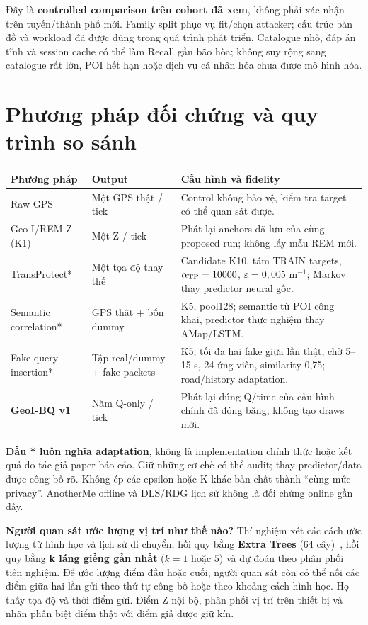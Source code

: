 Đây là \textbf{controlled comparison trên cohort đã xem}, không phải xác nhận trên tuyến/thành phố mới.
Family split phục vụ fit/chọn attacker; cấu trúc bản đồ và workload đã được dùng trong quá trình phát triển.
Catalogue nhỏ, đáp án tĩnh và session cache có thể làm Recall gần bão hòa; không suy rộng sang catalogue rất lớn,
POI hết hạn hoặc dịch vụ cá nhân hóa chưa được mô hình hóa.

\section{Phương pháp đối chứng và quy trình so sánh}
\noindent\begin{tabularx}{\linewidth}{@{}P{3.4cm}P{3.6cm}Y@{}}\toprule
\textbf{Phương pháp} & \textbf{Output} & \textbf{Cấu hình và fidelity}\\\midrule
Raw GPS & Một GPS thật / tick & Control không bảo vệ, kiểm tra target có thể quan sát được.\\
Geo-I/REM Z (K1) & Một Z / tick & Phát lại anchors đã lưu của cùng proposed run; không lấy mẫu REM mới.\\
TransProtect* & Một tọa độ thay thế & Candidate K10, tám TRAIN targets, $\alpha_{\rm TP}=10000$, $\varepsilon=0{,}005$ m$^{-1}$; Markov thay predictor neural gốc.\\
Semantic correlation* & GPS thật + bốn dummy & K5, pool128; semantic từ POI công khai, predictor thực nghiệm thay AMap/LSTM.\\
Fake-query insertion* & Tập real/dummy + fake packets & K5; tối đa hai fake giữa lần thật, chờ 5--15 s, 24 ứng viên, similarity 0,75; road/history adaptation.\\
\textbf{GeoI-BQ v1} & Năm Q-only / tick & Phát lại đúng Q/time của cấu hình chính đã đóng băng, không tạo draws mới.\\\bottomrule
\end{tabularx}
\textbf{Dấu * luôn nghĩa adaptation}, không là implementation chính thức hoặc kết quả do tác giả paper báo cáo.
Giữ những cơ chế có thể audit; thay predictor/data được công bố rõ. Không ép các epsilon hoặc K khác bản chất
thành ``cùng mức privacy''. AnotherMe offline và DLS/RDG lịch sử không là đối chứng online gần đây.

\textbf{Người quan sát ước lượng vị trí như thế nào?} Thí nghiệm xét các cách ước lượng từ hình học và lịch sử di chuyển, hồi quy bằng \textbf{Extra Trees} (64 cây)~\cite{extratrees}, hồi quy bằng \textbf{k láng giềng gần nhất} ($k=1$ hoặc $5$) và dự đoán theo phân phối tiên nghiệm. Để ước lượng điểm đầu hoặc cuối, người quan sát còn có thể nối các điểm giữa hai lần gửi theo thứ tự công bố hoặc theo khoảng cách hình học. Họ thấy tọa độ và thời điểm gửi. Điểm Z nội bộ, phân phối vị trí trên thiết bị và nhãn phân biệt điểm thật với điểm giả được giữ kín.

